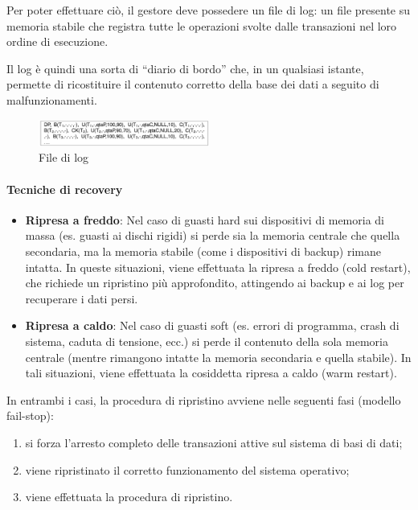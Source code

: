 Per poter effettuare ciò, il gestore deve possedere un file di log: un file presente su memoria stabile che registra tutte le operazioni svolte dalle transazioni nel loro ordine di esecuzione.

Il log è quindi una sorta di “diario di bordo” che, in un qualsiasi istante, permette di ricostituire il contenuto corretto della base dei dati a seguito di malfunzionamenti.

\begin{figure}[h]
    \centering
    \includegraphics[width=0.5\textwidth]{Media/log.png}
    \caption{File di log}
    \label{fig:log}
\end{figure}

\paragraph{Tecniche di recovery}

\begin{itemize}
    \item \textbf{Ripresa a freddo}: Nel caso di guasti hard sui dispositivi di memoria di massa (es. guasti ai dischi rigidi) si perde sia la memoria centrale che quella secondaria, ma la memoria stabile (come i dispositivi di backup) rimane intatta. In queste situazioni, viene effettuata la ripresa a freddo (cold restart), che richiede un ripristino più approfondito, attingendo ai backup e ai log per recuperare i dati persi.
    \item \textbf{Ripresa a caldo}: Nel caso di guasti soft (es. errori di programma, crash di sistema, caduta di tensione, ecc.) si perde il contenuto della sola memoria centrale (mentre rimangono intatte la memoria secondaria e quella stabile). In tali situazioni, viene effettuata la cosiddetta ripresa a caldo (warm restart).
\end{itemize}

In entrambi i casi, la procedura di ripristino avviene nelle seguenti fasi (modello fail-stop):

\begin{enumerate}
    \item si forza l’arresto completo delle transazioni attive sul sistema di basi di dati;
    \item viene ripristinato il corretto funzionamento del sistema operativo;
    \item viene effettuata la procedura di ripristino.
\end{enumerate}
